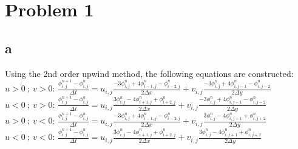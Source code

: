 \documentclass{article}
\begin{document}
 \section{Problem 1}
\subsection{a}
Using the 2nd order upwind method, the following equations are constructed: \newline
$u>0 \> ; \> v>0$: \newline
\newline
$\frac{\phi^{n+1}_{i,j}-\phi^{n}_{i,j}}{\Delta t} = u_{i,j}\frac{-3\phi^{n}_{i,j} + 4\phi^n_{i-1,j} - \phi^{n}_{i-2,j}}{2\Delta x} + v_{i,j}\frac{-3\phi^{n}_{i,j} + 4\phi^n_{i,j-1} - \phi^{n}_{i,j-2}}{2\Delta y}$ \newline
\newline
\newline
$u<0 \> ; \> v>0$: \newline
\newline
$\frac{\phi^{n+1}_{i,j}-\phi^{n}_{i,j}}{\Delta t} = u_{i,j}\frac{3\phi^{n}_{i,j} - 4\phi^n_{i+1,j} + \phi^{n}_{i+2,j}}{2\Delta x} + v_{i,j}\frac{-3\phi^{n}_{i,j} + 4\phi^n_{i,j-1} - \phi^{n}_{i,j-2}}{2\Delta y}$ \newline
\newline
\newline
$u>0 \> ; \> v<0$: \newline
\newline
$\frac{\phi^{n+1}_{i,j}-\phi^{n}_{i,j}}{\Delta t} = u_{i,j}\frac{-3\phi^{n}_{i,j} + 4\phi^n_{i-1,j} - \phi^{n}_{i-2,j}}{2\Delta x} + v_{i,j}\frac{3\phi^{n}_{i,j} - 4\phi^n_{i,j+1} + \phi^{n}_{i,j+2}}{2\Delta y}$ \newline
\newline
\newline
$u<0 \> ; \> v<0$: \newline
\newline
$\frac{\phi^{n+1}_{i,j}-\phi^{n}_{i,j}}{\Delta t} = u_{i,j}\frac{3\phi^{n}_{i,j} - 4\phi^n_{i+1,j} + \phi^{n}_{i+2,j}}{2\Delta x} + v_{i,j}\frac{3\phi^{n}_{i,j} - 4\phi^n_{i,j+1} + \phi^{n}_{i,j+2}}{2\Delta y}$ \newline
\end{document}

